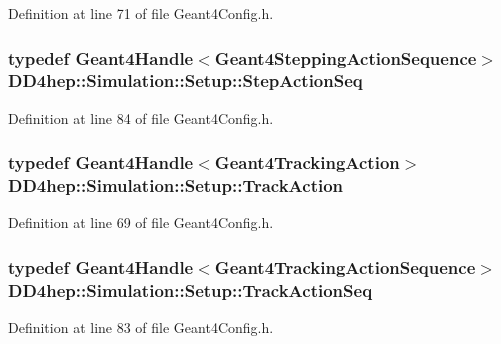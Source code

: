 Definition at line 71 of file Geant4Config.h.\hypertarget{namespace_d_d4hep_1_1_simulation_1_1_setup_ab53ef7047293eb31171e955f62418eaf}{
\subsubsection[{StepActionSeq}]{\setlength{\rightskip}{0pt plus 5cm}typedef {\bf Geant4Handle}$<${\bf Geant4SteppingActionSequence}$>$ {\bf DD4hep::Simulation::Setup::StepActionSeq}}}
\label{namespace_d_d4hep_1_1_simulation_1_1_setup_ab53ef7047293eb31171e955f62418eaf}


Definition at line 84 of file Geant4Config.h.\hypertarget{namespace_d_d4hep_1_1_simulation_1_1_setup_ab8429f4d09699162358a80f1c6d6955f}{
\subsubsection[{TrackAction}]{\setlength{\rightskip}{0pt plus 5cm}typedef {\bf Geant4Handle}$<${\bf Geant4TrackingAction}$>$ {\bf DD4hep::Simulation::Setup::TrackAction}}}
\label{namespace_d_d4hep_1_1_simulation_1_1_setup_ab8429f4d09699162358a80f1c6d6955f}


Definition at line 69 of file Geant4Config.h.\hypertarget{namespace_d_d4hep_1_1_simulation_1_1_setup_a5266c2f851adc926f84380c385c8dca4}{
\subsubsection[{TrackActionSeq}]{\setlength{\rightskip}{0pt plus 5cm}typedef {\bf Geant4Handle}$<${\bf Geant4TrackingActionSequence}$>$ {\bf DD4hep::Simulation::Setup::TrackActionSeq}}}
\label{namespace_d_d4hep_1_1_simulation_1_1_setup_a5266c2f851adc926f84380c385c8dca4}


Definition at line 83 of file Geant4Config.h.